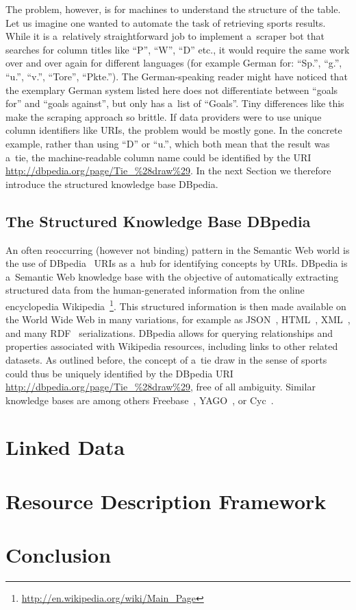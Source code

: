 The problem, however, is for machines to understand the structure of the table.
Let us imagine one wanted to automate the task of retrieving sports results.
While it is a~relatively straightforward job to implement a~scraper bot that
searches for column titles like ``P'', ``W'', ``D'' etc.,
it would require the same work over and over again for different languages
(for example German for: ``Sp.'', ``g.'', ``u.'', ``v.'', ``Tore'', ``Pkte.'').
The German-speaking reader might have noticed that the exemplary German system listed here
does not differentiate between ``goals for'' and ``goals against'', but only has a~list of ``Goals''.
Tiny differences like this make the scraping approach so brittle.
If data providers were to use unique column identifiers like URIs, the problem would be mostly gone.
In the concrete example, rather than using ``D'' or ``u.'', which both mean that the result was a~tie,
the machine-readable column name could be identified by the URI
\url{http://dbpedia.org/page/Tie_%28draw%29}.
In the next Section we therefore introduce the structured knowledge base DBpedia.

\subsection{The Structured Knowledge Base DBpedia}
An often reoccurring (however not binding) pattern in the Semantic Web world
is the use of DBpedia~\cite{Bizer2007} URIs as a~hub for identifying concepts by URIs.
DBpedia is a~Semantic Web knowledge base with the objective of
automatically extracting structured data from the human-generated information from
the online encyclopedia Wikipedia~\footnote{\url{http://en.wikipedia.org/wiki/Main_Page}}.
This structured information is then made available on the World Wide Web in many variations,
for example as JSON~\cite{Crockford2006}, HTML~\cite{LeHors1999}, XML~\cite{Bray1998},
and many RDF~\cite{Klyne2004} serializations.
DBpedia allows for querying relationships and properties associated with Wikipedia resources,
including links to other related datasets.
As outlined before, the concept of a~tie draw in the sense of sports
could thus be uniquely identified by the DBpedia URI \url{http://dbpedia.org/page/Tie_%28draw%29},
free of all ambiguity.
Similar knowledge bases are among others Freebase~\cite{Markoff2007},
YAGO~\cite{Suchanek2007}, or Cyc~\cite{Wilkins1997}.

\section{Linked Data}

\section{Resource Description Framework}

\section{Conclusion}